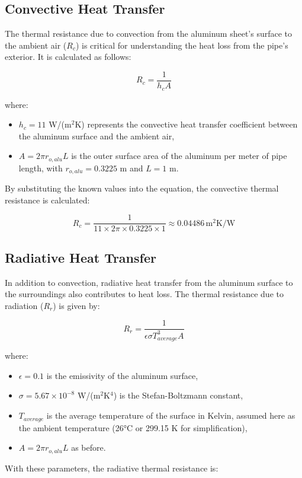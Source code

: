 \documentclass{article}
\begin{document}
\subsection*{Convective Heat Transfer}
The thermal resistance due to convection from the aluminum sheet's surface to the ambient air (\(R_c\)) is critical for understanding the heat loss from the pipe's exterior. It is calculated as follows:

\[
R_c = \frac{1}{h_c A}
\]

where:
\begin{itemize}
    \item \(h_c = 11\) W/(m\(^2\)K) represents the convective heat transfer coefficient between the aluminum surface and the ambient air,
    \item \(A = 2 \pi r_{o,alu} L\) is the outer surface area of the aluminum per meter of pipe length, with \(r_{o,alu} = 0.3225\) m and \(L = 1\) m.
\end{itemize}

By substituting the known values into the equation, the convective thermal resistance is calculated:

\[
R_c = \frac{1}{11 \times 2 \pi \times 0.3225 \times 1} \approx 0.04486 \, \text{m}^2\text{K/W}
\]

\subsection*{Radiative Heat Transfer}
In addition to convection, radiative heat transfer from the aluminum surface to the surroundings also contributes to heat loss. The thermal resistance due to radiation (\(R_r\)) is given by:

\[
R_r = \frac{1}{\epsilon \sigma T_{average}^3 A}
\]

where:
\begin{itemize}
    \item \(\epsilon = 0.1\) is the emissivity of the aluminum surface,
    \item \(\sigma = 5.67 \times 10^{-8}\) W/(m\(^2\)K\(^4\)) is the Stefan-Boltzmann constant,
    \item \(T_{average}\) is the average temperature of the surface in Kelvin, assumed here as the ambient temperature (26°C or 299.15 K for simplification),
    \item \(A = 2 \pi r_{o,alu} L\) as before.
\end{itemize}

With these parameters, the radiative thermal resistance is:
\end{document}

